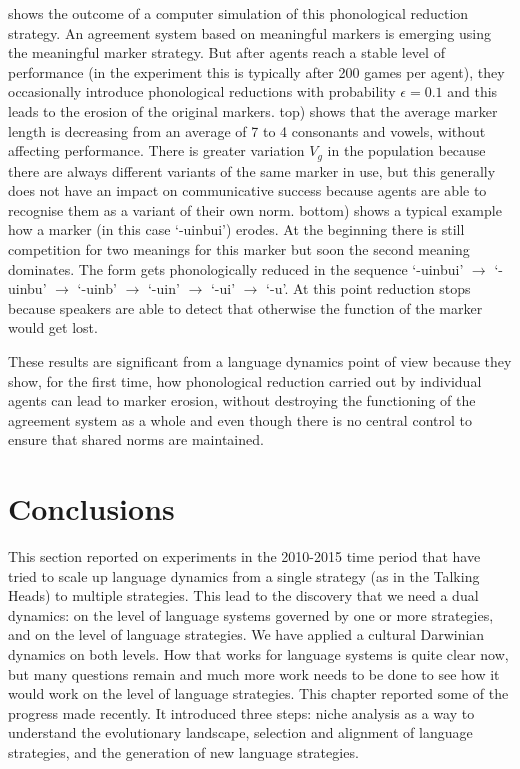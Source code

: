  shows the outcome of a computer simulation of this phonological reduction strategy. An agreement system based on meaningful markers is emerging using the meaningful marker strategy. But after agents reach a stable level of performance
(in the experiment this is typically  
after 200 games per agent), they occasionally introduce phonological reductions with probability $\epsilon=0.1$ 
and this leads to the erosion 
of the original markers.  top) shows that the average marker length is decreasing from an 
average of 7 to 4 consonants and vowels, without affecting performance. There is greater variation $V_g$ in 
the population because there are 
always different variants of the same marker in use, but this generally does not 
have an impact on communicative success because agents are able to recognise them as a variant of their own norm. 
 bottom) shows a typical example how a marker (in this case `-uinbui') erodes. At the beginning there is still 
competition for two meanings for this marker but soon the second meaning dominates. The form gets phonologically 
reduced in the sequence `-uinbui' $\rightarrow$ `-uinbu' $\rightarrow$ `-uinb' $\rightarrow$ `-uin' $\rightarrow$
`-ui' $\rightarrow$ `-u'. At this point reduction stops because speakers are able to detect that 
otherwise the function of the marker would get lost. 

These results are significant from a language dynamics point of view
because they show, for the first time, how phonological reduction carried 
out by individual agents can lead to marker erosion, without destroying the functioning of the agreement system as a whole
and even though there is no central control to ensure that shared norms are maintained. 

\section{Conclusions} 

This section reported on experiments in the 2010-2015 time period that have tried to scale
up language dynamics from a single strategy (as in the Talking Heads) to 
multiple strategies. This lead to the discovery that we need a dual dynamics: on the level of language systems
governed by one or more strategies, and on the level of language strategies. We have applied a cultural Darwinian dynamics 
on both levels. How that works for language systems is quite clear now, but many questions remain and much 
more work needs to be done to see how it would work on the level of language strategies. This chapter reported  
some of the progress made recently. It introduced three steps: niche analysis as a way to understand the evolutionary landscape, 
selection and alignment of language strategies, and the generation of new language strategies. 

